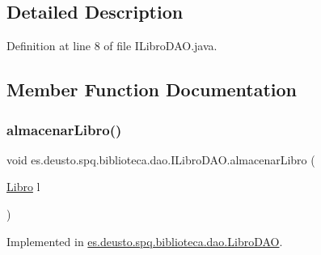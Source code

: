 \subsection{Detailed Description}


Definition at line 8 of file I\+Libro\+D\+A\+O.\+java.



\subsection{Member Function Documentation}
\mbox{\label{interfacees_1_1deusto_1_1spq_1_1biblioteca_1_1dao_1_1_i_libro_d_a_o_ad8e76a77aa5fc0900142921d7efb79f0}} 
\subsubsection{\texorpdfstring{almacenar\+Libro()}{almacenarLibro()}}
{\footnotesize\ttfamily void es.\+deusto.\+spq.\+biblioteca.\+dao.\+I\+Libro\+D\+A\+O.\+almacenar\+Libro (\begin{DoxyParamCaption}\item[{\mbox{\hyperlink{classes_1_1deusto_1_1spq_1_1biblioteca_1_1data_1_1_libro}{Libro}}}]{l }\end{DoxyParamCaption})}



Implemented in \mbox{\hyperlink{classes_1_1deusto_1_1spq_1_1biblioteca_1_1dao_1_1_libro_d_a_o_ad2e2db382c6dac9c6ba0ca95d12438ad}{es.\+deusto.\+spq.\+biblioteca.\+dao.\+Libro\+D\+AO}}.

